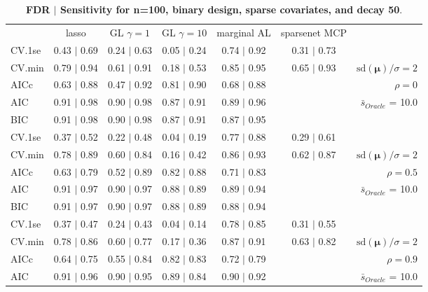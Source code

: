 \begin{table}\vspace{-.5cm}
\caption[l]{ {\it }
{ \bf FDR $\boldsymbol{\mid}$ Sensitivity for n=100, binary design, sparse covariates, and  decay  50}.}
\vspace{-.5cm}
\footnotesize{}
\begin{center}
\begin{tabular}{l*{5}{c}|r}
 & lasso & GL $\gamma=1$ & GL $\gamma=10$ & marginal AL & sparsenet MCP  & \\
 \cline{1-7}
CV.1se & 0.43 $\mid$ 0.69 & 0.24 $\mid$ 0.63 & 0.05 $\mid$ 0.24 & 0.74 $\mid$ 0.92 & 0.31 $\mid$ 0.73 & \\
CV.min & 0.79 $\mid$ 0.94 & 0.61 $\mid$ 0.91 & 0.18 $\mid$ 0.53 & 0.85 $\mid$ 0.95 & 0.65 $\mid$ 0.93 &  $\mathrm{sd}(\mathbf{\mu})/\sigma=2$ \\
AICc & 0.63 $\mid$ 0.88 & 0.47 $\mid$ 0.92 & 0.81 $\mid$ 0.90 & 0.68 $\mid$ 0.88 & & $\rho=0$ \\
AIC & 0.91 $\mid$ 0.98 & 0.90 $\mid$ 0.98 & 0.87 $\mid$ 0.91 & 0.89 $\mid$ 0.96 & &  \multirow{2}{*}{$\bar{s}_{Oracle}$ = 10.0} \\
BIC & 0.91 $\mid$ 0.98 & 0.90 $\mid$ 0.98 & 0.87 $\mid$ 0.91 & 0.87 $\mid$ 0.95 & &  \\
 \hline 
CV.1se & 0.37 $\mid$ 0.52 & 0.22 $\mid$ 0.48 & 0.04 $\mid$ 0.19 & 0.77 $\mid$ 0.88 & 0.29 $\mid$ 0.61 & \\
CV.min & 0.78 $\mid$ 0.89 & 0.60 $\mid$ 0.84 & 0.16 $\mid$ 0.42 & 0.86 $\mid$ 0.93 & 0.62 $\mid$ 0.87 &  $\mathrm{sd}(\mathbf{\mu})/\sigma=2$ \\
AICc & 0.63 $\mid$ 0.79 & 0.52 $\mid$ 0.89 & 0.82 $\mid$ 0.88 & 0.71 $\mid$ 0.83 & & $\rho=0.5$ \\
AIC & 0.91 $\mid$ 0.97 & 0.90 $\mid$ 0.97 & 0.88 $\mid$ 0.89 & 0.89 $\mid$ 0.94 & &  \multirow{2}{*}{$\bar{s}_{Oracle}$ = 10.0} \\
BIC & 0.91 $\mid$ 0.97 & 0.90 $\mid$ 0.97 & 0.88 $\mid$ 0.89 & 0.88 $\mid$ 0.94 & &  \\
 \hline 
CV.1se & 0.37 $\mid$ 0.47 & 0.24 $\mid$ 0.43 & 0.04 $\mid$ 0.14 & 0.78 $\mid$ 0.85 & 0.31 $\mid$ 0.55 & \\
CV.min & 0.78 $\mid$ 0.86 & 0.60 $\mid$ 0.77 & 0.17 $\mid$ 0.36 & 0.87 $\mid$ 0.91 & 0.63 $\mid$ 0.82 &  $\mathrm{sd}(\mathbf{\mu})/\sigma=2$ \\
AICc & 0.64 $\mid$ 0.75 & 0.55 $\mid$ 0.84 & 0.82 $\mid$ 0.83 & 0.72 $\mid$ 0.79 & & $\rho=0.9$ \\
AIC & 0.91 $\mid$ 0.96 & 0.90 $\mid$ 0.95 & 0.89 $\mid$ 0.84 & 0.90 $\mid$ 0.92 & &  \multirow{2}{*}{$\bar{s}_{Oracle}$ = 10.0} \\

\end{tabular}
\end{center}
\end{table}

